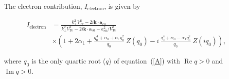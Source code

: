 \documentclass[draft]{agujournal2019}
\renewcommand{\vec}{\mathbf}
\begin{document}
{The electron contribution, $I_{\mathrm{electron}}$, is given by
\begin{linenomath*}
\begin{align}
I_{\mathrm{electron}}  & =\frac{k_{\perp}^{2}V_{Te}^{2}-2i\vec{k}\cdot\vec
{a}_{e0}}{k_{\perp}^{2}V_{Te}^{2}-2i\vec{k}\cdot\vec{a}_{e0}-a_{e0}^{2}%
/V_{Te}^{2}}\nonumber\\
& \times\left(  1+2\alpha_{1}+\frac{q_0^{4}+\alpha_{0}+\alpha_{1}q_0^{2}}%
{q_0}\ Z(q_0)-i\,\frac{q_0^{4}+\alpha_{0}-\alpha_{1}q_0^{2}}{q_0}\ Z(iq_0)\right),
\label{I_electron}
\end{align}
\end{linenomath*}
where $q_0$ is the only quartic root ($q$) of equation~(\ref{A}) with $\operatorname{Re}q > 0$ and $\operatorname{Im}q > 0$.

}
\end{document}
